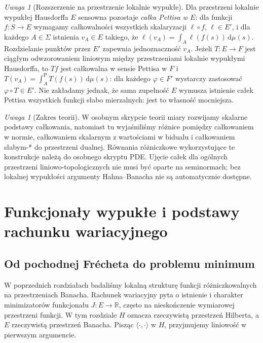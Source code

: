 \documentclass[11pt,a4paper]{article}
\numberwithin{equation}{section}
\theoremstyle{plain}
\theoremstyle{definition}
\theoremstyle{remark}
\newtheorem{uwaga}[twierdzenie]{Uwaga}
\newcommand{\R}{\mathbb R}
\begin{document}
\begin{uwaga}[Rozszerzenie na przestrzenie lokalnie wypukłe]
\label{rem:lcs-pettis15b}
Dla przestrzeni lokalnie wypukłej Hausdorffa $E$ sensowna
pozostaje \emph{całka Pettisa w $E$}: dla funkcji $f:S\to E$
wymagamy całkowalności wszystkich skalaryzacji $\ell\circ f$,
$\ell\in E'$, i dla każdego $A\in\Sigma$ istnienia $v_A\in E$
takiego, że $\ell(v_A)=\int_A\ell(f(s))\,\mathrm d\mu(s)$.
Rozdzielanie punktów przez $E'$ zapewnia jednoznaczność
$v_A$. Jeżeli $T:E\to F$ jest ciągłym odwzorowaniem liniowym
między przestrzeniami lokalnie wypukłymi Hausdorffa,
to $Tf$ jest całkowalna w sensie Pettisa w $F$ i
$T(v_A)=\int_A^{\mathrm P} T(f(s))\,\mathrm d\mu(s)$:
dla każdego $\varphi\in F'$ wystarczy zastosować
$\varphi\circ T\in E'$. Nie zakładamy jednak, że sama
zupełność $E$ wymusza istnienie całek Pettisa wszystkich
funkcji słabo mierzalnych: jest to własność mocniejsza.
\end{uwaga}

\begin{uwaga}[Zakres teorii]
W osobnym skrypcie teorii miary rozwijamy skalarne podstawy
całkowania, natomiast tu wyjaśniliśmy różnice pomiędzy
całkowaniem w normie, całkowaniem skalarnym z wartościami
w bidualu i całkowaniem słabym-* do przestrzeni dualnej.
Równania różniczkowe wykorzystujące te konstrukcje należą
do osobnego skryptu PDE. Ujęcie całek dla ogólnych przestrzeni
liniowo-topologicznych nie musi być oparte na seminormach;
bez lokalnej wypukłości argumenty Hahna--Banacha nie są
automatycznie dostępne.
\end{uwaga}

\addtocounter{section}{-1}
\endgroup


\setcounter{section}{15}
\section{Funkcjonały wypukłe i podstawy rachunku wariacyjnego}
\label{sec:wariacyjny16}

\subsection{Od pochodnej Frécheta do problemu minimum}

W poprzednich rozdziałach badaliśmy lokalną strukturę funkcji
różniczkowalnych na przestrzeniach Banacha. Rachunek wariacyjny pyta
o istnienie i charakter minimizatorów funkcjonału $J:E\to\R$,
często na nieskończenie wymiarowej przestrzeni funkcji.
W tym rozdziale $H$ oznacza rzeczywistą przestrzeń Hilberta,
a $E$ rzeczywistą przestrzeń Banacha. Pisząc $\langle\cdot,\cdot\rangle$
w $H$, przyjmujemy liniowość w pierwszym argumencie.
\end{document}
